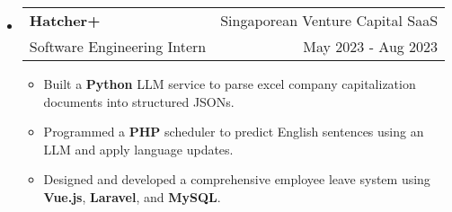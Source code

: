 \documentclass[letterpaper, 11pt]{article}
\makeatletter
\newcommand{\ResumeEntryTSDL}[4]{
  \vspace{1pt}\item
    \begin{tabular*}{\textwidth}[t]{l@{\extracolsep{\fill}}r} 
      \textbf{#1} & #2 \\
      #3 & #4 \\
    \end{tabular*}\vspace{-2.835pt} %
}
\newcommand{\ResumeItem}[2]{
  \item{
    \textbf{#1}{: #2 \vspace{-2.835pt}}
  }
}
\newcommand{\ResumeItemDefault}[1]{
  \item{
    #1 \vspace{-2.835pt}
  }
}
\newcommand{\ResumeEntryStart}{\begin{itemize}[leftmargin=0mm, label={}]}
\newcommand{\ResumeEntryEnd}{\end{itemize}\vspace{-2.835pt}} %
\newcommand{\ResumeItemListStart}{\begin{itemize}[leftmargin=5mm, label=$\bullet$, itemsep=1mm, parsep=1mm]} %
\newcommand{\ResumeItemListEnd}{\end{itemize}}
\makeatother
\begin{document}
  \ResumeEntryStart
    \ResumeEntryTSDL{Hatcher+}{Singaporean Venture Capital SaaS}{Software Engineering Intern}{May 2023 - Aug 2023}
    \ResumeItemListStart
      \ResumeItemDefault{Built a \textbf{Python} LLM service to parse excel company capitalization documents into structured JSONs.}
      \ResumeItemDefault{Programmed a \textbf{PHP} scheduler to predict English sentences using an LLM and apply language updates.}
      \ResumeItemDefault{Designed and developed a comprehensive employee leave system using \textbf{Vue.js}, \textbf{Laravel}, and \textbf{MySQL}.}
    \ResumeItemListEnd
  \ResumeEntryEnd
\end{document}
